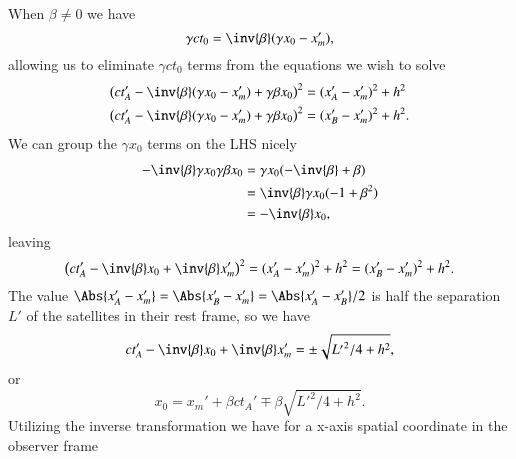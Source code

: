 {When \(\beta \ne 0\) we have
%
\begin{equation}\label{eqn:relElectroDynProblemSet1:1302}
\gamma c t_0 = \inv{\beta}(\gamma x_0 - x_m'),
\end{equation}
%
allowing us to eliminate \(\gamma c t_0\) terms from the equations we wish to solve
%
\begin{equation}\label{eqn:relElectroDynProblemSet1:1262}
\begin{aligned}
\left( c t_A' - \inv{\beta}( \gamma x_0 - x_m') + \gamma \beta x_0 \right)^2 &= (x_A' - x_m')^2 + h^2 \\
\left( c t_A' - \inv{\beta}( \gamma x_0 - x_m') + \gamma \beta x_0 \right)^2 &= (x_B' - x_m')^2 + h^2.
\end{aligned}
\end{equation}
%
We can group the \(\gamma x_0\) terms on the LHS nicely
%
\begin{equation}\label{eqn:relElectroDynProblemSet1:1540}
\begin{aligned}
- \inv{\beta} \gamma x_0 \gamma \beta x_0
&=
\gamma x_0 ( - \inv{\beta} + \beta ) \\
&=
\inv{\beta} \gamma x_0 ( - 1 + \beta^2 ) \\
&=
-\inv{\beta} x_0,
\end{aligned}
\end{equation}
leaving
\begin{equation}\label{eqn:relElectroDynProblemSet1:1400}
\left( c t_A' -\inv{\beta} x_0 + \inv{\beta} x_m' \right)^2 = (x_A' - x_m')^2 + h^2 = (x_B' - x_m')^2 + h^2.
\end{equation}
%
The value \(\Abs{x_A' - x_m'} = \Abs{x_B' - x_m'} = \Abs{x_A' - x_B'}/2\) is half the separation \(L'\) of the satellites in their rest frame, so we have
%
\begin{equation}\label{eqn:relElectroDynProblemSet1:1420}
c t_A' -\inv{\beta} x_0 + \inv{\beta} x_m' = \pm \sqrt{{L'}^2/4 + h^2},
\end{equation}
or
\begin{equation}\label{eqn:relElectroDynProblemSet1:1440}
x_0 = x_m' + \beta c t_A' \mp \beta \sqrt{{L'}^2/4 + h^2}.
\end{equation}
%
Utilizing the inverse transformation we have for a x-axis spatial coordinate in the observer frame
}
